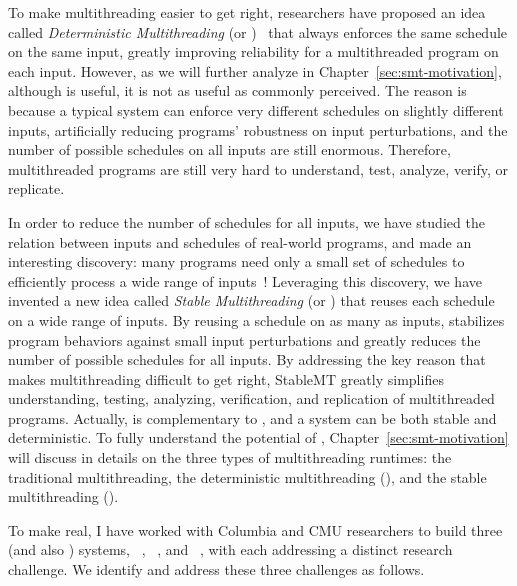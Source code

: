 To make multithreading easier to get right, researchers have proposed an idea 
called \emph{Deterministic Multithreading} (or \dmt)~\cite{dthreads:sosp11, 
dpj:oopsla09, dmp:asplos09, kendo:asplos09, coredet:asplos10} that always 
enforces the same schedule on the same input, greatly improving reliability for 
a multithreaded program on each input. However, as we will further analyze in
Chapter~\ref{sec:smt-motivation}, although \dmt is useful, it is not as useful
as commonly perceived. The reason is because a typical \dmt system can enforce
very different schedules on slightly different inputs, artificially reducing
programs' robustness on input perturbations, and the number of possible
schedules on all inputs are still enormous. Therefore, multithreaded programs
are still very hard to understand, test, analyze, verify, or replicate.

In order to reduce the number of schedules for all inputs, we have studied the
relation between inputs and schedules of real-world programs, and made an
interesting discovery: many programs need only a small set of schedules to
efficiently process a wide range of inputs~\cite{smt:cacm}! Leveraging this
discovery, we have invented a new idea called \emph{Stable Multithreading} (or 
\smt) that reuses each schedule on a wide range of inputs. By reusing a 
schedule on as many as inputs, \smt stabilizes program behaviors against small 
input perturbations and greatly reduces the number of possible schedules for all
inputs. By addressing the key reason that makes multithreading difficult to get
right, StableMT greatly simplifies understanding, testing, analyzing,
verification, and replication of multithreaded programs. Actually, \smt is
complementary to \dmt,
and a system can be both stable and deterministic. To fully understand the
potential of \smt, Chapter~\ref{sec:smt-motivation} will discuss in details on
the three types of multithreading runtimes: the traditional multithreading, the
deterministic multithreading (\dmt), and the stable multithreading (\smt).


To make \smt real, I have worked with Columbia and CMU researchers to build
three \smt (and also \dmt) systems, \tern~\cite{cui:tern:osdi10},
\peregrine~\cite{peregrine:sosp11}, and \parrot~\cite{parrot:sosp13}, with each
addressing a distinct research challenge. We identify and address these three
challenges as follows.

